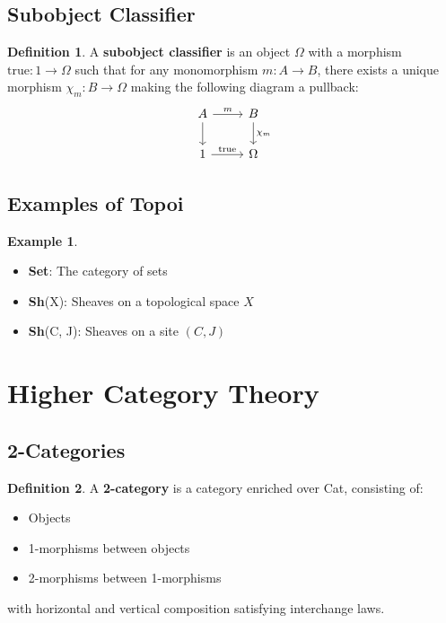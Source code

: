 \documentclass[11pt]{article}
\theoremstyle{definition}
\newtheorem{definition}{Definition}[section]
\newtheorem{example}{Example}[section]
\begin{document}
\subsection{Subobject Classifier}
\begin{definition}
A \textbf{subobject classifier} is an object $\Omega$ with a morphism $\text{true}: 1 \to \Omega$ such that for any monomorphism $m: A \to B$, there exists a unique morphism $\chi_m: B \to \Omega$ making the following diagram a pullback:
$$\begin{tikzcd}
A \arrow[r, "m"] \arrow[d] & B \arrow[d, "\chi_m"] \\
1 \arrow[r, "\text{true}"] & \Omega
\end{tikzcd}$$
\end{definition}

\subsection{Examples of Topoi}
\begin{example}
\begin{itemize}
    \item \textbf{Set}: The category of sets
    \item \textbf{Sh}(X): Sheaves on a topological space $X$
    \item \textbf{Sh}(C, J): Sheaves on a site $(C, J)$
\end{itemize}
\end{example}

\section{Higher Category Theory}

\subsection{2-Categories}
\begin{definition}
A \textbf{2-category} is a category enriched over Cat, consisting of:
\begin{itemize}
    \item Objects
    \item 1-morphisms between objects
    \item 2-morphisms between 1-morphisms
\end{itemize}
with horizontal and vertical composition satisfying interchange laws.
\end{definition}
\end{document}
